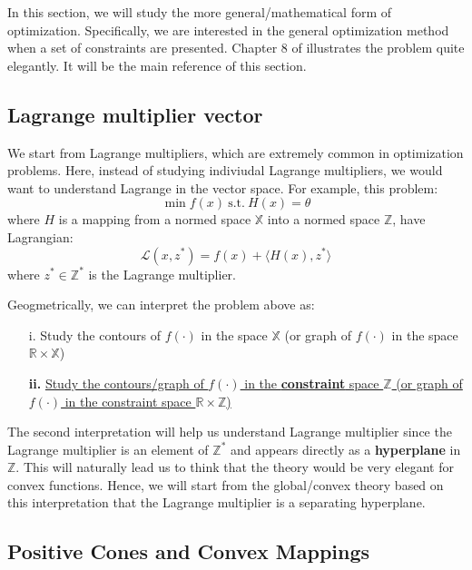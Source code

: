 In this section, we will study the more general/mathematical form of optimization. Specifically, we are interested in the general optimization method when a set of constraints are presented.
Chapter 8 of \citet{luenberger1997optimization} illustrates the problem quite elegantly. It will be the main reference of this section.

\subsection{Lagrange multiplier vector}
We start from Lagrange multipliers, which are extremely common in optimization problems. Here, instead of studying indiviudal Lagrange multipliers, we would want to understand Lagrange in the vector space. For example, this problem:
$$\min f(x)\ \text{s.t.}\ H(x)=\theta$$
where $H$ is a mapping from a normed space $\mathbb{X}$ into a normed space $\mathbb{Z}$, have Lagrangian:
$$\mathcal{L}(x,z^*)=f(x)+\langle H(x),z^*\rangle$$
where $z^*\in \mathbb{Z}^*$ is the Lagrange multiplier. 

Geogmetrically, we can interpret the problem above as:
\begin{enumerate}
    \item[i.] Study the contours of $f(\cdot)$ in the space $\mathbb{X}$ (or graph of $f(\cdot)$ in the space $\mathbb{R}\times \mathbb{X}$)
    \item[\textbf{ii.}] \underline{Study the contours/graph of $f(\cdot)$ in the \textbf{constraint} space $\mathbb{Z}$ (or graph of $f(\cdot)$ in the constraint space $\mathbb{R}\times \mathbb{Z}$)}
\end{enumerate}

The second interpretation will help us understand Lagrange multiplier since the Lagrange multiplier is an element of $\mathbb{Z}^*$ and appears directly as a \textbf{hyperplane} in $\mathbb{Z}$.
This will naturally lead us to think that the theory would be very elegant for convex functions. Hence, we will start from the global/convex theory based on this interpretation that the Lagrange multiplier is a separating hyperplane.

\subsection{Positive Cones and Convex Mappings}
